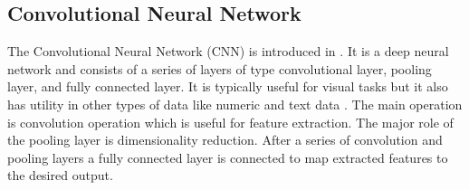 \documentclass{ws-ijait}
\begin{document}
\subsection{Convolutional Neural Network}
The Convolutional Neural Network (CNN) is introduced in \cite{krizhevsky2012imagenet}. It is a deep neural network and consists of a series of layers of type convolutional layer, pooling layer, and fully connected layer. It is typically useful for visual tasks but it also has utility in other types of data like numeric and text data \cite{chakole2021convolutional}. The main operation is convolution operation which is useful for feature extraction. The major role of the pooling layer is dimensionality reduction. After a series of convolution and pooling layers a fully connected layer is connected to map extracted features to the desired output.
\end{document}
